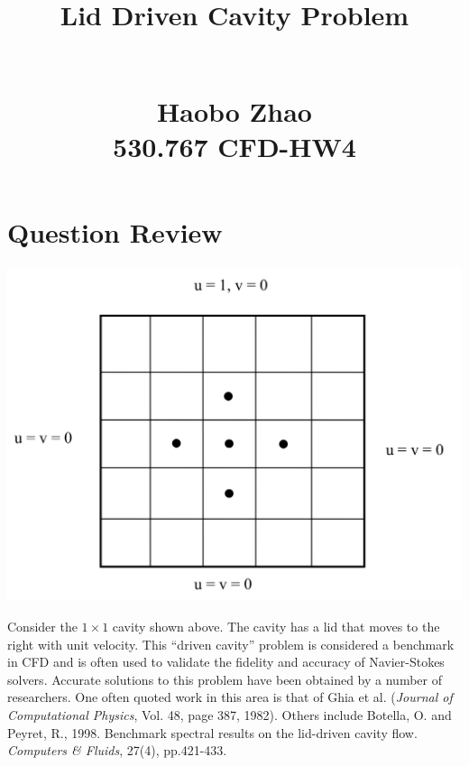 \documentclass[12pt]{article}
\begin{document}
\title{\begin{Huge}Lid Driven Cavity Problem\end{Huge}\\Haobo Zhao\\530.767 CFD-HW4}
\maketitle

\tableofcontents





\newpage
\section{Question Review}
\begin{center}
    \includegraphics[width=0.6\linewidth]{figures/Question_grid.jpg}
\end{center}
Consider the \( 1 \times 1 \) cavity shown above. The cavity has a lid that moves to the right with unit velocity. This ``driven cavity'' problem is considered a benchmark in CFD and is often used to validate the fidelity and accuracy of Navier-Stokes solvers. Accurate solutions to this problem have been obtained by a number of researchers. One often quoted work in this area is that of Ghia et al. (\textit{Journal of Computational Physics}, Vol. 48, page 387, 1982). Others include Botella, O. and Peyret, R., 1998. Benchmark spectral results on the lid-driven cavity flow. \textit{Computers \& Fluids}, 27(4), pp.421-433.
\end{document}
